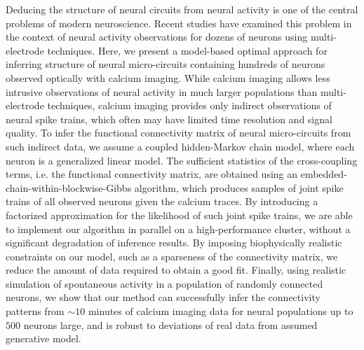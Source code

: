 Deducing the structure of neural circuits from neural activity is one of the central problems of modern neuroscience. Recent studies have examined this problem in the context of neural activity observations for dozens of neurons using multi-electrode techniques. Here, we present a model-based optimal approach for inferring structure of neural micro-circuits containing hundreds of neurons observed optically with calcium imaging. While calcium imaging allows less intrusive observations of neural activity in much larger populations than multi-electrode techniques, calcium imaging provides only indirect observations of neural spike trains, which often may have limited time resolution and signal quality.  To infer the functional connectivity matrix of neural micro-circuits from such indirect data, we assume a coupled hidden-Markov chain model, where each neuron is a generalized linear model.  The sufficient statistics of the cross-coupling terms, i.e. the functional connectivity matrix, are obtained using an embedded-chain-within-blockwise-Gibbs algorithm, which produces samples of joint spike trains of all observed neurons given the calcium traces. By introducing a factorized approximation for the likelihood of such joint spike trains, we are able to implement our algorithm in parallel on a high-performance cluster, without a significant degradation of inference results.  By imposing biophysically realistic constraints on our model, such as a sparseness of the connectivity matrix, we reduce the amount of data required to obtain a good fit.  Finally, using realistic simulation of spontaneous activity in a population of randomly connected neurons, we show that our method can successfully infer the connectivity patterns from $\sim 10$ minutes of calcium imaging data for neural populations up to $500$ neurons large, and is robust to deviations of real data from assumed generative model.

